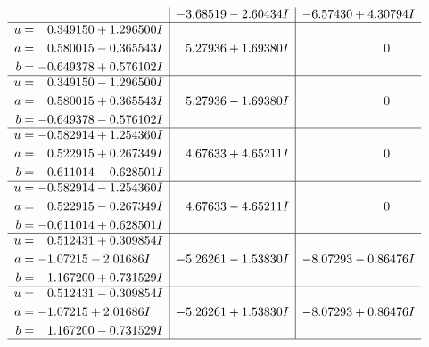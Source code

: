 \documentclass[1p]{elsarticle_modified}
\theoremstyle{definition}
\begin{document}
$$\begin{array}{c|c|c}
 & -3.68519 - 2.60434 I & -6.57430 + 4.30794 I \\ \hline\begin{aligned}
u &= \phantom{-}0.349150 + 1.296500 I \\
a &= \phantom{-}0.580015 - 0.365543 I \\
b &= -0.649378 + 0.576102 I\end{aligned}
 & \phantom{-}5.27936 + 1.69380 I & \phantom{-0.000000 } 0 \\ \hline\begin{aligned}
u &= \phantom{-}0.349150 - 1.296500 I \\
a &= \phantom{-}0.580015 + 0.365543 I \\
b &= -0.649378 - 0.576102 I\end{aligned}
 & \phantom{-}5.27936 - 1.69380 I & \phantom{-0.000000 } 0 \\ \hline\begin{aligned}
u &= -0.582914 + 1.254360 I \\
a &= \phantom{-}0.522915 + 0.267349 I \\
b &= -0.611014 - 0.628501 I\end{aligned}
 & \phantom{-}4.67633 + 4.65211 I & \phantom{-0.000000 } 0 \\ \hline\begin{aligned}
u &= -0.582914 - 1.254360 I \\
a &= \phantom{-}0.522915 - 0.267349 I \\
b &= -0.611014 + 0.628501 I\end{aligned}
 & \phantom{-}4.67633 - 4.65211 I & \phantom{-0.000000 } 0 \\ \hline\begin{aligned}
u &= \phantom{-}0.512431 + 0.309854 I \\
a &= -1.07215 - 2.01686 I \\
b &= \phantom{-}1.167200 + 0.731529 I\end{aligned}
 & -5.26261 - 1.53830 I & -8.07293 - 0.86476 I \\ \hline\begin{aligned}
u &= \phantom{-}0.512431 - 0.309854 I \\
a &= -1.07215 + 2.01686 I \\
b &= \phantom{-}1.167200 - 0.731529 I\end{aligned}
 & -5.26261 + 1.53830 I & -8.07293 + 0.86476 I\\
 \hline 
 \end{array}$$\newpage$$\begin{array}{c|c|c}  

\end{array}$$
\end{document}
